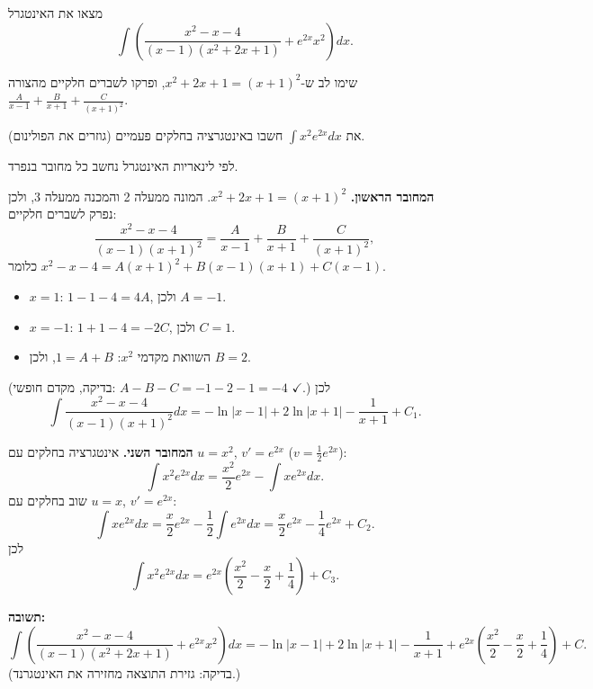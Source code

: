 
\begin{question}
מצאו את האינטגרל
\[ \int\left(\frac{x^2-x-4}{(x-1)(x^2+2x+1)}+e^{2x}x^2\right)dx. \]
\end{question}

\begin{hint}
שימו לב ש-$x^2+2x+1=(x+1)^2$, ופרקו לשברים חלקיים מהצורה $\frac{A}{x-1}+\frac{B}{x+1}+\frac{C}{(x+1)^2}$.
\end{hint}

\begin{hint}
את $\int x^2e^{2x}dx$ חשבו באינטגרציה בחלקים פעמיים (גוזרים את הפולינום).
\end{hint}

\begin{solution}
לפי לינאריות האינטגרל נחשב כל מחובר בנפרד.

\textbf{המחובר הראשון.} $x^2+2x+1=(x+1)^2$. המונה ממעלה 2 והמכנה ממעלה 3, ולכן נפרק לשברים חלקיים:
\[ \frac{x^2-x-4}{(x-1)(x+1)^2} = \frac{A}{x-1}+\frac{B}{x+1}+\frac{C}{(x+1)^2}, \]
כלומר $x^2-x-4 = A(x+1)^2+B(x-1)(x+1)+C(x-1)$.
\begin{itemize}
  \item $x=1$: $1-1-4=4A$, ולכן $A=-1$.
  \item $x=-1$: $1+1-4=-2C$, ולכן $C=1$.
  \item השוואת מקדמי $x^2$: $1=A+B$, ולכן $B=2$.
\end{itemize}
(בדיקה, מקדם חופשי: $A-B-C=-1-2-1=-4$ $\checkmark$.) לכן
\[ \int\frac{x^2-x-4}{(x-1)(x+1)^2}dx = -\ln|x-1| + 2\ln|x+1| - \frac{1}{x+1}+C_1. \]

\textbf{המחובר השני.} אינטגרציה בחלקים עם $u=x^2$, $v'=e^{2x}$ ($v=\frac12e^{2x}$):
\[ \int x^2e^{2x}dx = \frac{x^2}{2}e^{2x} - \int xe^{2x}dx. \]
שוב בחלקים עם $u=x$, $v'=e^{2x}$:
\[ \int xe^{2x}dx = \frac{x}{2}e^{2x}-\frac12\int e^{2x}dx = \frac x2e^{2x}-\frac14e^{2x}+C_2. \]
לכן
\[ \int x^2e^{2x}dx = e^{2x}\left(\frac{x^2}{2}-\frac{x}{2}+\frac14\right)+C_3. \]

\textbf{תשובה:}
\[ \int\left(\frac{x^2-x-4}{(x-1)(x^2+2x+1)}+e^{2x}x^2\right)dx = -\ln|x-1|+2\ln|x+1|-\frac{1}{x+1}+e^{2x}\left(\frac{x^2}{2}-\frac{x}{2}+\frac14\right)+C. \]
(בדיקה: גזירת התוצאה מחזירה את האינטגרנד.)
\end{solution}
